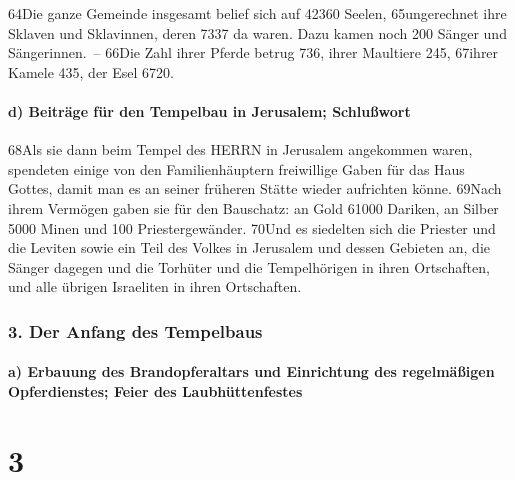 64Die ganze Gemeinde insgesamt belief sich auf 42360 Seelen,
65ungerechnet ihre Sklaven und Sklavinnen, deren 7337 da waren. Dazu
kamen noch 200 Sänger und Sängerinnen.~-- 66Die Zahl ihrer Pferde betrug
736, ihrer Maultiere 245, 67ihrer Kamele 435, der Esel 6720.

\hypertarget{d-beitruxe4ge-fuxfcr-den-tempelbau-in-jerusalem-schluuxdfwort}{%
\paragraph{d) Beiträge für den Tempelbau in Jerusalem;
Schlußwort}\label{d-beitruxe4ge-fuxfcr-den-tempelbau-in-jerusalem-schluuxdfwort}}

68Als sie dann beim Tempel des HERRN in Jerusalem angekommen waren,
spendeten einige von den Familienhäuptern freiwillige Gaben für das Haus
Gottes, damit man es an seiner früheren Stätte wieder aufrichten könne.
69Nach ihrem Vermögen gaben sie für den Bauschatz: an Gold 61000
Dariken, an Silber 5000 Minen und 100 Priestergewänder. 70Und es
siedelten sich die Priester und die Leviten sowie ein Teil des Volkes in
Jerusalem und dessen Gebieten an, die Sänger dagegen und die Torhüter
und die Tempelhörigen in ihren Ortschaften, und alle übrigen Israeliten
in ihren Ortschaften.

\hypertarget{der-anfang-des-tempelbaus}{%
\subsubsection{3. Der Anfang des
Tempelbaus}\label{der-anfang-des-tempelbaus}}

\hypertarget{a-erbauung-des-brandopferaltars-und-einrichtung-des-regelmuxe4uxdfigen-opferdienstes-feier-des-laubhuxfcttenfestes}{%
\paragraph{a) Erbauung des Brandopferaltars und Einrichtung des
regelmäßigen Opferdienstes; Feier des
Laubhüttenfestes}\label{a-erbauung-des-brandopferaltars-und-einrichtung-des-regelmuxe4uxdfigen-opferdienstes-feier-des-laubhuxfcttenfestes}}

\hypertarget{section-2}{%
\section{3}\label{section-2}}

